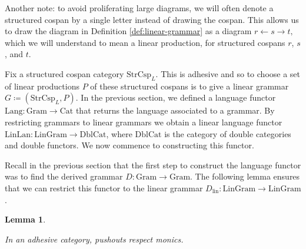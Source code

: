 \documentclass{amsart}
\newcommand{\lin}{_{\textrm{lin}}}
\newcommand{\Cat}{\cat{Cat}}
\newcommand{\DblCat}{\cat{DblCat}}
\newcommand{\Gram}{\cat{Gram}}
\newcommand{\LinGram}{\cat{LinGram}}
\newcommand{\StrCsp}{\cat{StrCsp}}
\newcommand{\Lang}{\mathrm{Lang}}
\newcommand{\LinLang}{\mathrm{LinLan}}
\newcommand{\cat}[1]{\mathrm{#1}}
\newcommand{\from}{\colon}
\newtheorem{lemma}[theorem]{Lemma}
\theoremstyle{remark}
\theoremstyle{definition}
\begin{document}
Another note: to avoid proliferating large diagrams, we will often
denote a structured cospan by a single letter instead of drawing the
cospan.  This allows us to draw the diagram in Definition
\ref{def:linear-grammar} as a diagram
%
\(
  r \gets s \to t, 
\)
%
which we will understand to mean a linear production, for structured cospans $ r $, $ s $, and $ t $.
  
Fix a structured cospan category $ \StrCsp_{L} $. This is adhesive
and so to choose a set of linear productions $ P $ of these structured
cospans is to give a linear grammar
%
\(
  G \coloneqq ( \StrCsp_{L} , P ).
\)
% 
In the previous section, we defined a language functor
%
\(
  \Lang \from \Gram \to \Cat 
\)
% 
that returns the language associated to a grammar. By restricting
grammars to linear grammars we obtain a linear language functor
$ \LinLang \from \LinGram \to \DblCat $, where $ \DblCat $ is the
category of double categories and double functors.  We now commence
to constructing this functor.

Recall in the previous section that the first step to construct the
language functor was to find the derived grammar $ D \from \Gram
\to \Gram $. The following lemma
%
%
ensures that we can restrict this
functor to the linear grammar $ D\lin \from \LinGram \to \LinGram $.

\begin{lemma} \label{thm:po-respect-monics}
  
  In an adhesive category, pushouts respect monics.

\end{lemma}
\end{document}
